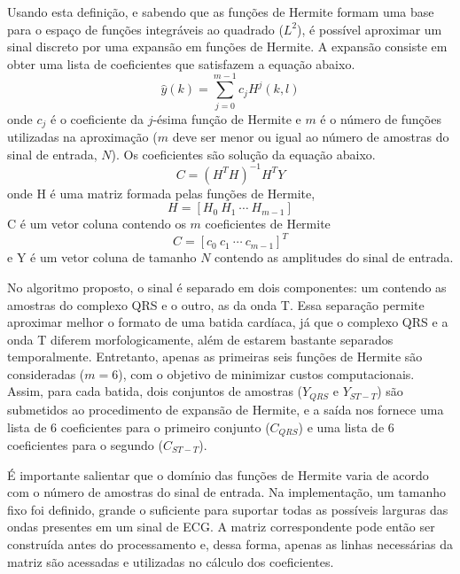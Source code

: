 Usando esta definição, e sabendo que as funções de Hermite formam uma base para o espaço de funções integráveis ao quadrado ($L^2$), é possível aproximar um sinal discreto por uma expansão em funções de Hermite. A expansão consiste em obter uma lista de coeficientes que satisfazem a equação abaixo.
\begin{equation} \label{equ:hermite_expansion}
   \hat{y}(k) = \sum_{j=0}^{m-1} c_jH^j(k,l)
\end{equation}
onde $c_j$ é o coeficiente da $j$-ésima função de Hermite e $m$ é o número de funções utilizadas na aproximação ($m$ deve ser menor ou igual ao número de amostras do sinal de entrada, $N$). Os coeficientes são solução da equação abaixo.
\begin{equation} \label{equ:solve}
    C = (H^TH)^{-1}H^TY
\end{equation}
onde H é uma matriz formada pelas funções de Hermite,
\begin{equation}
    H = [H_0\ H_1\ \cdots\ H_{m-1}]
\end{equation}
C é um vetor coluna contendo os $m$ coeficientes de Hermite
\begin{equation}
    C = [c_0\ c_1\ \cdots\ c_{m-1}]^T
\end{equation}
e Y é um vetor coluna de tamanho $N$ contendo as amplitudes do sinal de entrada.

No algoritmo proposto, o sinal é separado em dois componentes: um contendo as amostras do complexo QRS e o outro, as da onda T. Essa separação permite aproximar melhor o formato de uma batida cardíaca, já que o complexo QRS e a onda T diferem morfologicamente, além de estarem bastante separados temporalmente. Entretanto, apenas as primeiras seis funções de Hermite são consideradas ($m = 6$), com o objetivo de minimizar custos computacionais. Assim, para cada batida, dois conjuntos de amostras ($Y_{QRS}$ e $Y_{ST-T}$) são submetidos ao procedimento de expansão de Hermite, e a saída nos fornece uma lista de 6 coeficientes para o primeiro conjunto ($C_{QRS}$) e uma lista de 6 coeficientes para o segundo ($C_{ST-T}$).

É importante salientar que o domínio das funções de Hermite varia de acordo com o número de amostras do sinal de entrada. Na implementação, um tamanho fixo foi definido, grande o suficiente para suportar todas as possíveis larguras das ondas presentes em um sinal de ECG. A matriz correspondente pode então ser construída antes do processamento e, dessa forma, apenas as linhas necessárias da matriz são acessadas e utilizadas no cálculo dos coeficientes.

